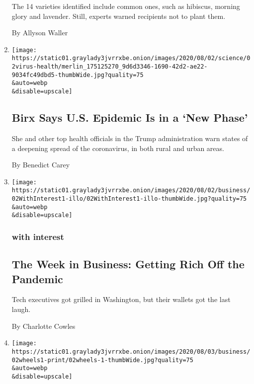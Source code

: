 \begin{enumerate}
  The 14 varieties identified include common ones, such as hibiscus,
  morning glory and lavender. Still, experts warned recipients not to
  plant them.

  By Allyson Waller
\item
  \href{/2020/08/02/health/dr-birx-coronavirus-phase.html}{}

  \texttt{[image: https://static01.graylady3jvrrxbe.onion/images/2020/08/02/science/02virus-health/merlin\_175125270\_9d6d3346-1690-42d2-ae22-9034fc49dbd5-thumbWide.jpg?quality=75\\\&auto=webp\\\&disable=upscale]}

  \hypertarget{birx-says-us-epidemic-is-in-a-new-phase}{%
  \subsection{Birx Says U.S. Epidemic Is in a `New
  Phase'}\label{birx-says-us-epidemic-is-in-a-new-phase}}

  She and other top health officials in the Trump administration warn
  states of a deepening spread of the coronavirus, in both rural and
  urban areas.

  By Benedict Carey
\item
  \href{/2020/08/02/business/the-week-in-business-technology-companies-congress.html}{}

  \texttt{[image: https://static01.graylady3jvrrxbe.onion/images/2020/08/02/business/02WithInterest1-illo/02WithInterest1-illo-thumbWide.jpg?quality=75\\\&auto=webp\\\&disable=upscale]}

  \hypertarget{with-interest}{%
  \subsubsection{with interest}\label{with-interest}}

  \hypertarget{the-week-in-business-getting-rich-off-the-pandemic}{%
  \subsection{The Week in Business: Getting Rich Off the
  Pandemic}\label{the-week-in-business-getting-rich-off-the-pandemic}}

  Tech executives got grilled in Washington, but their wallets got the
  last laugh.

  By Charlotte Cowles
\item
  \href{/2020/08/02/business/brinkerhoff-racing-child-trafficking.html}{}

  \texttt{[image: https://static01.graylady3jvrrxbe.onion/images/2020/08/03/business/02wheels1-print/02wheels-1-thumbWide.jpg?quality=75\\\&auto=webp\\\&disable=upscale]}


\end{enumerate}
